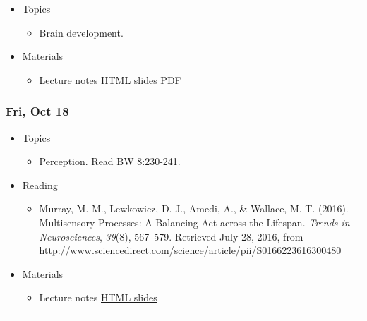 \documentclass[]{article}
\providecommand{\tightlist}{%
  \setlength{\itemsep}{0pt}\setlength{\parskip}{0pt}}
\begin{document}
\begin{itemize}
\tightlist
\item
  Topics

  \begin{itemize}
  \tightlist
  \item
    Brain development.
  \end{itemize}
\item
  Materials

  \begin{itemize}
  \tightlist
  \item
    Lecture notes \textbar{} \href{}{HTML slides} \textbar{}
    \href{}{PDF}
  \end{itemize}
\end{itemize}

\hypertarget{fri-oct-18}{%
\subsubsection{Fri, Oct 18}\label{fri-oct-18}}

\begin{itemize}
\tightlist
\item
  Topics

  \begin{itemize}
  \tightlist
  \item
    Perception. Read BW 8:230-241.
  \end{itemize}
\item
  Reading

  \begin{itemize}
  \tightlist
  \item
    Murray, M. M., Lewkowicz, D. J., Amedi, A., \& Wallace, M. T.
    (2016). Multisensory Processes: A Balancing Act across the Lifespan.
    \emph{Trends in Neurosciences}, \emph{39}(8), 567--579. Retrieved
    July 28, 2016, from
    \url{http://www.sciencedirect.com/science/article/pii/S0166223616300480}
  \end{itemize}
\item
  Materials

  \begin{itemize}
  \tightlist
  \item
    Lecture notes \textbar{} \href{}{HTML slides}
  \end{itemize}
\end{itemize}

\begin{center}\rule{0.5\linewidth}{\linethickness}\end{center}
\end{document}
